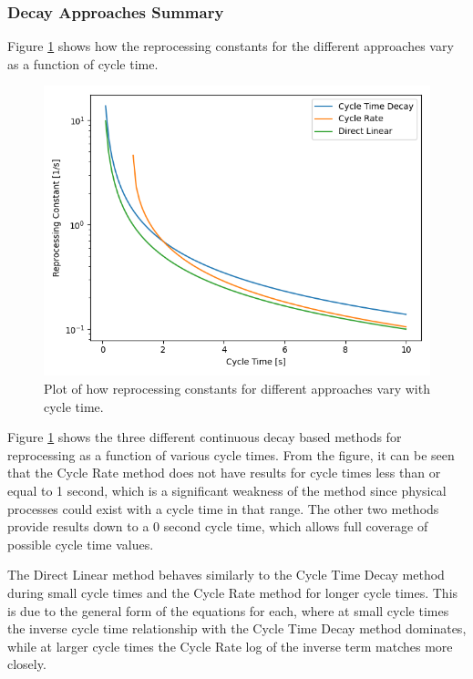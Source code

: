\subsubsection{Decay Approaches Summary}

Figure \ref{fig:repr_cnst} shows how the reprocessing constants for the different approaches vary as a function of cycle time.

\begin{figure}[H]
  \centering
  \includegraphics[scale=0.45]{images/cont-compare-cycles.png}
  \caption{Plot of how reprocessing constants for different approaches vary with cycle time.}
   \label{fig:repr_cnst}
\end{figure}

Figure \ref{fig:repr_cnst} shows the three different continuous decay based methods for reprocessing as a function of various cycle times. From the figure, it can be seen that the Cycle Rate method does not have results for cycle times less than or equal to 1 second, which is a significant weakness of the method since physical processes could exist with a cycle time in that range. The other two methods provide results down to a 0 second cycle time, which allows full coverage of possible cycle time values.

The Direct Linear method behaves similarly to the Cycle Time Decay method during small cycle times and the Cycle Rate method for longer cycle times. This is due to the general form of the equations for each, where at small cycle times the inverse cycle time relationship with the Cycle Time Decay method dominates, while at larger cycle times the Cycle Rate log of the inverse term matches more closely.


